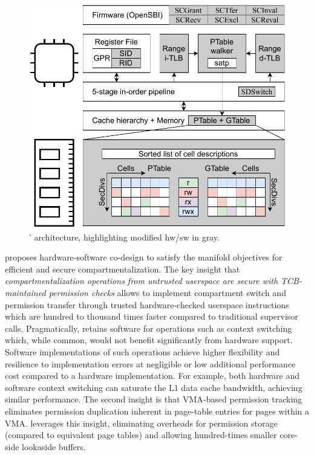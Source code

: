 \begin{figure}
  \centering
  \includegraphics[width=0.85\linewidth]{media/seccells/seccell_arch.pdf}
  \caption[\seccells: Architecture.]
          {\seccells' architecture, highlighting modified hw/sw in gray.}
  \label{fig:seccell_arch}
\end{figure}

\seccells proposes hardware-software co-design to satisfy the
manifold objectives for efficient and secure compartmentalization.
The key insight that \emph{compartmentalization operations from untrusted userspace
are secure with TCB-maintained permission checks} allows \seccells to
implement compartment switch and permission transfer through
trusted hardware-checked userspace instructions which are
hundred to thousand times faster compared to traditional supervisor calls.
Pragmatically, \seccells retains software for operations such as 
context switching which, while common, would not benefit significantly 
from hardware support.
Software implementations of such operations achieve higher flexibility and
resilience to implementation errors at negligible or low additional performance
cost compared to a hardware implementation.
For example, both hardware and software context switching can saturate
the L1 data cache bandwidth, achieving similar performance.
The second insight is that VMA-based permission tracking eliminates 
permission duplication inherent in page-table entries for pages 
within a VMA.
\seccells leverages this insight, eliminating overheads for 
permission storage (compared to equivalent page tables) and 
allowing hundred-times smaller core-side lookaside buffers. 

